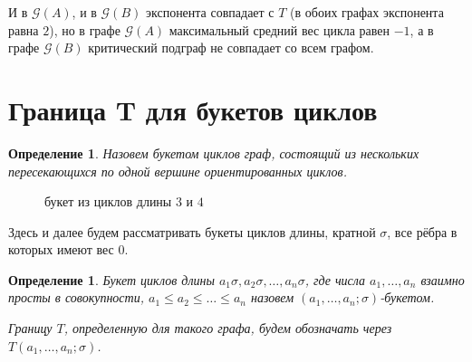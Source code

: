 \documentclass[12pt]{article}
\newtheorem{definition}[theorem]{Определение}
\begin{document}
И в $\mathcal{G}(A)$, и в $\mathcal{G}(B)$ экспонента совпадает с $T$ (в обоих графах экспонента равна $2$), но в графе $\mathcal{G}(A)$ максимальный средний вес цикла равен $-1$, а в графе $\mathcal{G}(B)$ критический подграф не совпадает со всем графом.

\section{Граница T для букетов циклов}
\label{wedge}
\begin{definition} Назовем букетом циклов граф, состоящий из нескольких пересекающихся по одной вершине ориентированных циклов.
\end{definition}

\begin{figure}[H]
\centering
{}
\caption{букет из циклов длины $3$ и $4$}
\end{figure}

Здесь и далее будем рассматривать букеты циклов длины, кратной $\sigma$, все рёбра в которых имеют вес $0$.

\begin{definition}
Букет циклов длины $a_1\sigma, a_2\sigma, \dots, a_n\sigma$, где числа $a_1, \dots, a_n$ взаимно просты в совокупности, $a_1\le a_2 \le \dots \le a_n$ назовем $(a_1, \dots, a_n; \sigma)$-букетом.

Границу $T$, определенную для такого графа, будем обозначать через $T(a_1, \dots, a_n; \sigma)$.
\end{definition}
\end{document}
